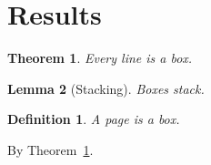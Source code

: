 \documentclass{article}
\begin{document}
\newtheorem{theorem}{Theorem}
\newtheorem{lemma}[theorem]{Lemma}
\newtheorem{defn}{Definition}[section]
\section{Results}
\begin{theorem}\label{thm:a}
Every line is a box.
\end{theorem}
\begin{lemma}[Stacking]
Boxes stack.
\end{lemma}
\begin{defn}
A page is a box.
\end{defn}
By Theorem~\ref{thm:a}.
\end{document}

